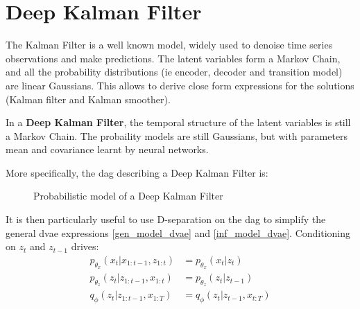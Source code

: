 \chapter{Deep Kalman Filter}\label{sec:DKF}

The Kalman Filter is a well known model, widely used to denoise time series observations and make predictions. The latent variables form a Markov Chain, and all the probability distributions (ie encoder, decoder and transition model) are linear Gaussians. This allows to derive close form expressions for the solutions (Kalman filter and Kalman smoother).

In a \textbf{Deep Kalman Filter}, the temporal structure of the latent variables is still a Markov Chain. The probaility models are still Gaussians, but with parameters mean and covariance learnt by neural networks.

More specifically, the \gls{dag} describing a Deep Kalman Filter is:

\begin{figure}[h]
    \centering
    \label{fig:graphical_model_dkf}
\caption{Probabilistic model of a Deep Kalman Filter}
\end{figure}

It is then particularly useful to use D-separation on the \gls{dag} to simplify the general \gls{dvae} expressions \ref{gen_model_dvae} and \ref{inf_model_dvae}. Conditioning on $z_t$ and $z_{t-1}$ drives:
\begin{align}
    p_{\theta_x}(x_t \vert x_{1:t-1}, z_{1:t}) &= p_{\theta_x}(x_t \vert z_t) \\
    p_{\theta_z}(z_t \vert z_{1:t-1}, x_{1:t}) &= p_{\theta_z}(z_t \vert z_{t-1}) \\
    \label{dkf_posterior}
    q_{\phi}(z_t \vert z_{1:t-1}, x_{1:T}) &= q_{\phi}(z_t \vert z_{t-1}, x_{t:T}) 
\end{align}

